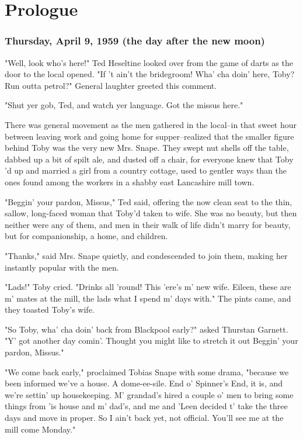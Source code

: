 

\chapter{Prologue}

\subsection{Thursday, April 9, 1959 (the day after the new moon)}

"Well, look who's here!" Ted Heseltine looked over from the game of darts as the door to the local opened. "If 't ain't the bridegroom! Wha' cha doin' here, Toby? Run outta petrol?" General laughter greeted this comment.

"Shut yer gob, Ted, and watch yer language. Got the missus here."

There was general movement as the men gathered in the local–in that sweet hour between leaving work and going home for supper–realized that the smaller figure behind Toby was the very new Mrs. Snape. They swept nut shells off the table, dabbed up a bit of spilt ale, and dusted off a chair, for everyone knew that Toby 'd up and married a girl from a country cottage, used to gentler ways than the ones found among the workers in a shabby east Lancashire mill town.

"Beggin' your pardon, Missus," Ted said, offering the now clean seat to the thin, sallow, long-faced woman that Toby'd taken to wife. She was no beauty, but then neither were any of them, and men in their walk of life didn't marry for beauty, but for companionship, a home, and children.

"Thanks," said Mrs. Snape quietly, and condescended to join them, making her instantly popular with the men.

"Lads!" Toby cried. "Drinks all 'round! This 'ere's m' new wife. Eileen, these are m' mates at the mill, the lads what I spend m' days with." The pints came, and they toasted Toby's wife.

"So Toby, wha' cha doin' back from Blackpool early?" asked Thurstan Garnett. "Y' got another day comin'. Thought you might like to stretch it out{\el} Beggin' your pardon, Missus."

"We come back early," proclaimed Tobias Snape with some drama, "because we been informed we've a house. A dome-ee-sile. End o' Spinner's End, it is, and we're settin' up housekeeping. M' grandad's hired a couple o' men to bring some things from 'is house and m' dad's, and me and 'Leen decided t' take the three days and move in proper. So I ain't back yet, not official. You'll see me at the mill come Monday."

